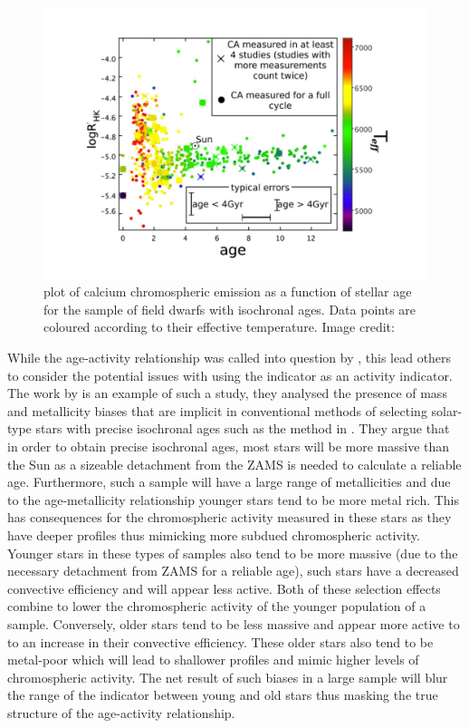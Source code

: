 \begin{figure}
    \centering
    \includegraphics[scale=0.4]{Figures/2-Historical_overview/pace_2013.pdf}
    \caption[\citet{Pace_2013} age-activity relationship]{\citet{Pace_2013} plot of calcium chromospheric emission as a function of stellar age for the sample of field dwarfs with isochronal ages. Data points are coloured according to their effective temperature. Image credit: \citet{Pace_2013}}
    \label{fig:pace_2013_plot}
\end{figure}

While the age-activity relationship was called into question by \citet{Pace_2013}, this lead others to consider the potential issues with using the \Rprime indicator as an activity indicator. The work by \citet{Lorenzo_Oliveira_etal_2016} is an example of such a study, they analysed the presence of mass and metallicity biases that are implicit in conventional methods of selecting solar-type stars with precise isochronal ages such as the method in \citet{Pace_2013}. They argue that in order to obtain precise isochronal ages, most stars will be more massive than the Sun as a sizeable detachment from the ZAMS is needed to calculate a reliable age. Furthermore, such a sample will have a large range of metallicities and due to the age-metallicity relationship younger stars tend to be more metal rich. This has consequences for the chromospheric activity measured in these stars as they have deeper \caII profiles thus mimicking more subdued chromospheric activity. Younger stars in these types of samples also tend to be more massive (due to the necessary detachment from ZAMS for a reliable age), such stars have a decreased convective efficiency and will appear less active. Both of these selection effects combine to lower the chromospheric activity of the younger population of a sample. Conversely, older stars tend to be less massive and appear more active to to an increase in their convective efficiency. These older stars also tend to be metal-poor which will lead to shallower \caII profiles and mimic higher levels of chromospheric activity. The net result of such biases in a large sample will blur the range of the \Rprime indicator between young and old stars thus masking the true structure of the age-activity relationship.

